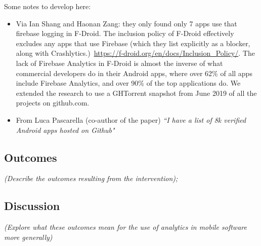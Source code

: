 Some notes to develop here:
\begin{itemize}
    \item Via Ian Shang and Haonan Zang: they only found only 7 apps use that firebase logging in F-Droid. The inclusion policy of F-Droid effectively excludes any apps that use Firebase (which they list explicitly as a blocker, along with Crashlytics.)~\url{https://f-droid.org/en/docs/Inclusion_Policy/}. The lack of Firebase Analytics in F-Droid is almost the inverse of what commercial developers do in their Android apps, where over 62\% of all apps include Firebase Analytics, and over 90\% of the top applications do. We extended the research to use a GHTorrent snapshot from  June 2019 of all the projects on github.com.
    \item From Luca Pascarella (co-author of the paper) \emph{``I have a list of 8k verified Android apps hosted on Github"}

\end{itemize}

\subsection{Outcomes} 
\textit{(Describe the outcomes resulting from the intervention); }

\subsection{Discussion} 
\textit{(Explore what these outcomes mean for the use of analytics in mobile software more generally)}

